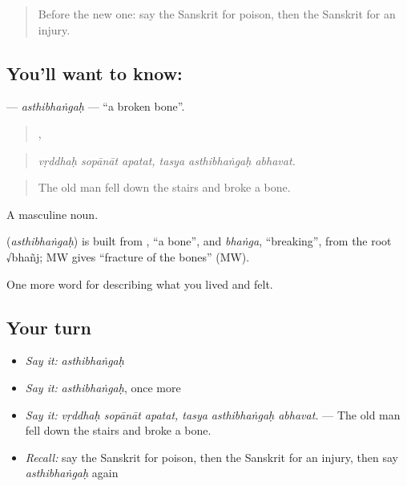 \label{lesson:SA-C480-asthibhangah}



\begin{quote}
Before the new one: say the Sanskrit for poison, then the Sanskrit for an injury.
\end{quote}

\subsection*{You'll want to know: }
\textbf{} — \emph{asthibhaṅgaḥ} — \textquotedblleft{}a broken bone\textquotedblright{}.

\begin{quote}
  ,   
\end{quote}

\begin{quote}
\emph{vṛddhaḥ sopānāt apatat, tasya asthibhaṅgaḥ abhavat.}
\end{quote}

\begin{quote}
The old man fell down the stairs and broke a bone.
\end{quote}

A masculine noun.

\begin{cousinweb}
\textbf{} (\emph{asthibhaṅgaḥ}) is built from \textbf{}, \textquotedblleft{}a bone\textquotedblright{}, and \emph{bhaṅga}, \textquotedblleft{}breaking\textquotedblright{}, from the root √bhañj; MW gives \textquotedblleft{}fracture of the bones\textquotedblright{} (MW).
\end{cousinweb}

\begin{grammarlens}[title={What you've built}]
One more word for describing what you lived and felt.
\end{grammarlens}

\subsection*{Your turn}
\begin{itemize}
\raggedright
  \item \emph{Say it:} \emph{asthibhaṅgaḥ}
  \item \emph{Say it:} \emph{asthibhaṅgaḥ}, once more
  \item \emph{Say it:} \emph{vṛddhaḥ sopānāt apatat, tasya asthibhaṅgaḥ abhavat.} — The old man fell down the stairs and broke a bone.
  \item \emph{Recall:} say the Sanskrit for poison, then the Sanskrit for an injury, then say \emph{asthibhaṅgaḥ} again
\end{itemize}


